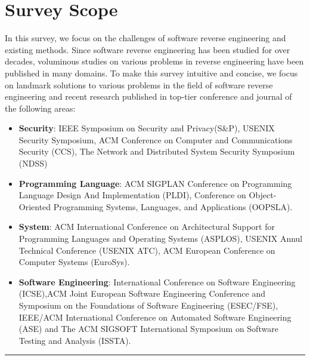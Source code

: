 
\section{Survey Scope} \label{sec:background-scope}
In this survey, we focus on the challenges of software reverse engineering and
existing methods. Since software reverse engineering has been studied for over
decades, voluminous studies on various problems in reverse engineering have
been published in many domains.
To make this survey intuitive and concise, we focus on landmark solutions to
various problems in the field of software reverse engineering and recent
research published in top-tier conference and journal of the following areas:

\begin{itemize}
  \item \textbf{Security}: IEEE Symposium on Security and Privacy(S\&P),
  USENIX Security Symposium, ACM Conference on Computer and Communications
  Security (CCS), The Network and Distributed System Security Symposium (NDSS)
  \item \textbf{Programming Language}: ACM SIGPLAN Conference on Programming
  Language Design And Implementation (PLDI), Conference on Object-Oriented
  Programming Systems, Languages, and Applications (OOPSLA).
  \item \textbf{System}: ACM International Conference on Architectural Support
  for Programming Languages and Operating Systems (ASPLOS), USENIX Annul
  Technical Conference (USENIX ATC), ACM European Conference on Computer
  Systems (EuroSys).
  \item \textbf{Software Engineering}: International Conference on Software
  Engineering (ICSE),ACM Joint European Software Engineering Conference and
  Symposium on the Foundations of Software Engineering (ESEC/FSE), IEEE/ACM
  International Conference on Automated Software Engineering (ASE) and The ACM
  SIGSOFT International Symposium on Software Testing and Analysis (ISSTA).
\end{itemize}

\noindent\rule{8cm}{0.4pt}

\newpage
